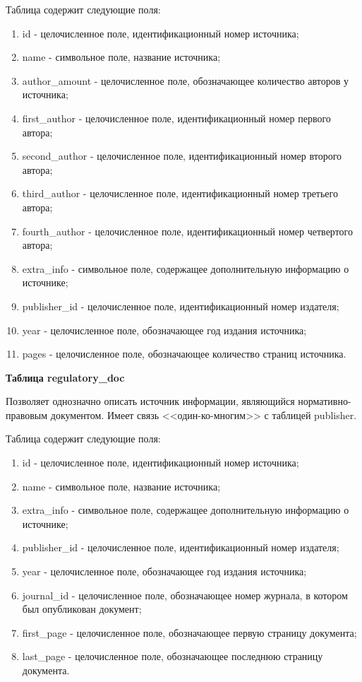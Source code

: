 Таблица содержит следующие поля:
\begin{enumerate}
	\item id - целочисленное поле, идентификационный номер источника;
	\item name - символьное поле, название источника;
	\item author\_amount - целочисленное поле, обозначающее количество авторов у источника;
	\item first\_author - целочисленное поле, идентификационный номер первого автора;
	\item second\_author - целочисленное поле, идентификационный номер второго автора;
	\item third\_author - целочисленное поле, идентификационный номер третьего автора;
	\item fourth\_author - целочисленное поле, идентификационный номер четвертого автора;
	\item extra\_info - символьное поле, содержащее дополнительную информацию о источнике;
	\item publisher\_id - целочисленное поле, идентификационный номер издателя;
	\item year - целочисленное поле, обозначающее год издания источника;
	\item pages - целочисленное поле, обозначающее количество страниц источника.
\end{enumerate}

\hfill \break

{\bf Таблица regulatory\_doc}

Позволяет однозначно описать источник информации, являющийся нормативно-правовым документом. Имеет связь <<один-ко-многим>> с таблицей publisher. 


Таблица содержит следующие поля:
\begin{enumerate}
	\item id - целочисленное поле, идентификационный номер источника;
	\item name - символьное поле, название источника;
	\item extra\_info - символьное поле, содержащее дополнительную информацию о источнике;
	\item publisher\_id - целочисленное поле, идентификационный номер издателя;
	\item year - целочисленное поле, обозначающее год издания источника;
	\item journal\_id - целочисленное поле, обозначающее номер журнала, в котором был опубликован документ;
	\item first\_page - целочисленное поле, обозначающее первую страницу документа;
	\item last\_page - целочисленное поле, обозначающее последнюю страницу документа.
\end{enumerate}


